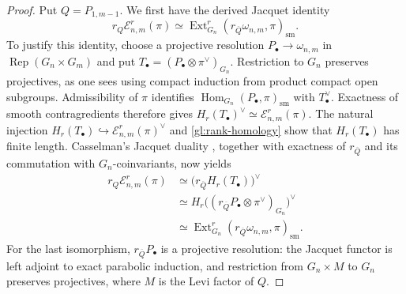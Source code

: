 \documentclass[10pt,a4paper]{article}
\newtheorem{lemma}[theorem]{Lemma}
\theoremstyle{definition}
\theoremstyle{remark}
\numberwithin{equation}{section}
\newcommand{\rep}{\operatorname{Rep}}
\newcommand{\cE}{\mathcal{E}}
\newcommand{\sm}{\mathrm{sm}}
\newcommand{\hra}{\hookrightarrow}
\DeclareMathOperator{\Hom}{Hom}
\DeclareMathOperator{\Ext}{Ext}
\begin{document}
\begin{proof}
Put $Q=P_{1,m-1}$. We first have the derived Jacquet identity
\begin{equation}\label{eq:derived-jacquet}
 r_Q\cE^r_{n,m}(\pi)
 \simeq\Ext^r_{G_n}(r_{\overline Q}\omega_{n,m},\pi)_\sm.
\end{equation}
To justify this identity, choose a projective resolution
$P_\bullet\to\omega_{n,m}$ in $\rep(G_n\times G_m)$ and put
$T_\bullet=(P_\bullet\otimes\pi^\vee)_{G_n}$.
Restriction to $G_n$ preserves projectives, as one sees using
compact induction from product compact open subgroups. Admissibility
of $\pi$ identifies $\Hom_{G_n}(P_\bullet,\pi)_\sm$ with
$T_\bullet^\vee$. Exactness of smooth contragredients
\cite[Proposition~2.1.11]{Casselman1995} therefore gives
$H_r(T_\bullet)^\vee\simeq\cE^r_{n,m}(\pi)$.
The natural injection
$H_r(T_\bullet)\hra\cE^r_{n,m}(\pi)^\vee$ and
\cref{gl:rank-homology} show that $H_r(T_\bullet)$ has finite length.
Casselman's Jacquet duality \cite[Corollary~4.2.5]{Casselman1995},
together with exactness of $r_{\overline Q}$ and its commutation
with $G_n$-coinvariants, now yields
\[
 \begin{aligned}
 r_Q\cE^r_{n,m}(\pi)
 &\simeq\bigl(r_{\overline Q}H_r(T_\bullet)\bigr)^\vee\\
 &\simeq H_r\bigl((r_{\overline Q}P_\bullet
                   \otimes\pi^\vee)_{G_n}\bigr)^\vee\\
 &\simeq\Ext^r_{G_n}(r_{\overline Q}\omega_{n,m},\pi)_\sm.
 \end{aligned}
\]
For the last isomorphism, $r_{\overline Q}P_\bullet$ is a projective
resolution: the Jacquet functor is left adjoint to exact parabolic
induction, and restriction from $G_n\times M$ to $G_n$ preserves
projectives, where $M$ is the Levi factor of $Q$.


\end{proof}
\end{document}
